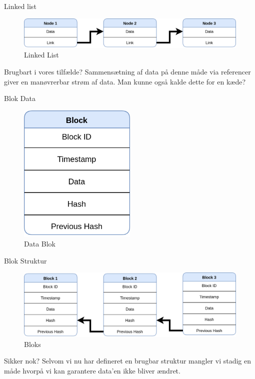 \documentclass[12pt,t]{beamer}
\begin{document}
\begin{frame}{Linked list}
\begin{figure}
	\centering
	\includegraphics[width=1.1\textwidth]{ll.png}
	\caption{Linked List}
\end{figure}

\begin{block}{Brugbart i vores tilfælde?}
	Sammensætning af data på denne måde via referencer giver en  manøvrerbar strøm af data. Man kunne også kalde dette for en kæde? 
\end{block}
\end{frame}

\begin{frame}{Blok Data}
\begin{figure}
	\centering
	\includegraphics[width=0.5\textwidth]{block.png}
	\caption{Data Blok}
\end{figure}
\end{frame}

\begin{frame}{Blok Struktur}
\begin{figure}
	\centering
	\includegraphics[width=1\textwidth]{bc.png}
	\caption{Bloks}
\end{figure}

\begin{block}{Sikker nok?}
	Selvom vi nu har defineret en brugbar struktur mangler vi stadig en måde hvorpå vi kan garantere data'en ikke bliver ændret.
\end{block}
\end{frame}
\end{document}
